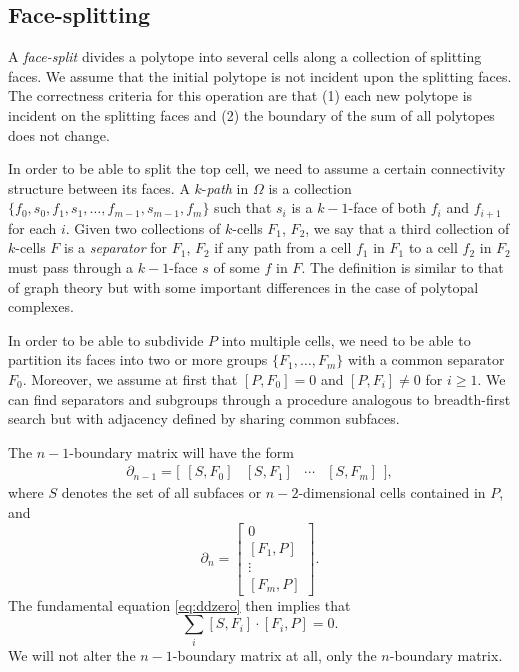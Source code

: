 \documentclass[twocolumn]{article}
\begin{document}
\subsection{Face-splitting}

A \emph{face-split} divides a polytope into several cells along a collection of splitting faces.
We assume that the initial polytope is not incident upon the splitting faces.
The correctness criteria for this operation are that (1) each new polytope is incident on the splitting faces and (2) the boundary of the sum of all polytopes does not change.

In order to be able to split the top cell, we need to assume a certain connectivity structure between its faces.
A $k$-\emph{path} in $\Omega$ is a collection $\{f_0, s_0, f_1, s_1, \ldots, f_{m - 1}, s_{m - 1}, f_m\}$ such that $s_i$ is a $k - 1$-face of both $f_i$ and $f_{i + 1}$ for each $i$.
Given two collections of $k$-cells $F_1$, $F_2$, we say that a third collection of $k$-cells $F$ is a \emph{separator} for $F_1$, $F_2$ if any path from a cell $f_1$ in $F_1$ to a cell $f_2$ in $F_2$ must pass through a $k - 1$-face $s$ of some $f$ in $F$.
The definition is similar to that of graph theory but with some important differences in the case of polytopal complexes.

In order to be able to subdivide $P$ into multiple cells, we need to be able to partition its faces into two or more groups $\{F_1, \ldots, F_m\}$ with a common separator $F_0$.
Moreover, we assume at first that $[P, F_0] = 0$ and $[P, F_i] \neq 0$ for $i \ge 1$.
We can find separators and subgroups through a procedure analogous to breadth-first search but with adjacency defined by sharing common subfaces.

The $n - 1$-boundary matrix will have the form
\begin{equation}
    \partial_{n - 1} = \Big[\begin{matrix}[S, F_0] & [S, F_1] & \cdots & [S, F_m]\end{matrix}\Big],
\end{equation}
where $S$ denotes the set of all subfaces or $n - 2$-dimensional cells contained in $P$, and
\begin{equation}
    \partial_n = \left[\begin{matrix} 0 \\ [F_1, P] \\ \vdots \\ [F_m, P]\end{matrix}\right].
\end{equation}
The fundamental equation \eqref{eq:ddzero} then implies that
\begin{equation}
    \sum_i[S, F_i]\cdot[F_i, P] = 0.
    \label{eq:face-split-ddzero}
\end{equation}
We will not alter the $n - 1$-boundary matrix at all, only the $n$-boundary matrix.
\end{document}
